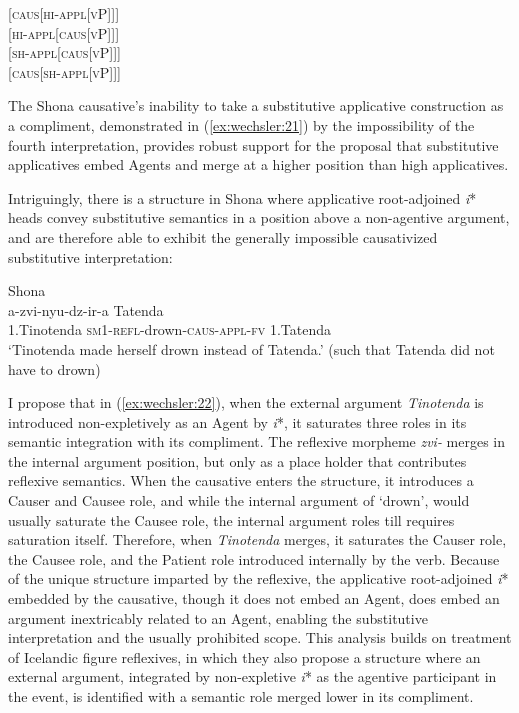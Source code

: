 \documentclass[output=paper,modfonts,nonflat]{langsci/langscibook}
\begin{document}
   \textsc{[caus[hi-appl[vP]]]}\\
  \textsc{[hi-appl[caus[vP]]]}\\
  \textsc{[sh-appl[caus[vP]]]}\\
  {\textsc{[caus[sh-appl[vP]]]}}\\
\z


The Shona causative’s inability to take a substitutive applicative construction as a compliment, demonstrated in (\ref{ex:wechsler:21}) by the impossibility of the fourth interpretation, provides robust support for the proposal that substitutive applicatives embed Agents and merge at a higher position than high applicatives. 



Intriguingly, there is a structure in Shona where applicative root-adjoined \textit{i}* heads convey substitutive semantics in a position above a non-agentive argument, and are therefore able to exhibit the generally impossible causativized substitutive interpretation:


\ea\label{ex:wechsler:22}
Shona\\
  {a-zvi-nyu-dz-ir-a} {Tatenda}\\
1.Tinotenda  \textsc{sm1-refl-}drown\textsc{{}-caus-appl-fv}  1.Tatenda\\
\glt ‘Tinotenda made herself drown instead of Tatenda.'
(such that Tatenda did not have to drown)\\
\z

I propose that in (\ref{ex:wechsler:22}), when the external argument \textit{Tinotenda} is introduced non-expletively as an Agent by \textit{i}*, it saturates three roles in its semantic integration with its compliment. The reflexive morpheme \textit{zvi-} merges in the internal argument position, but only as a place holder that contributes reflexive semantics. When the causative enters the structure, it introduces a Causer and Causee role, and while the internal argument of ‘drown’, would usually saturate the Causee role, the internal argument roles till requires saturation itself. Therefore, when \textit{Tinotenda} merges, it saturates the Causer role, the Causee role, and the Patient role introduced internally by the verb. Because of the unique structure imparted by the reflexive, the applicative root-adjoined \textit{i}* embedded by the causative, though it does not embed an Agent, does embed an argument inextricably related to an Agent, enabling the substitutive interpretation and the usually prohibited scope. This analysis builds on  treatment of Icelandic figure reflexives, in which they also propose a structure where an external argument, integrated by non-expletive \textit{i}* as the agentive participant in the event, is identified with a semantic role merged lower in its compliment. 
\end{document}
